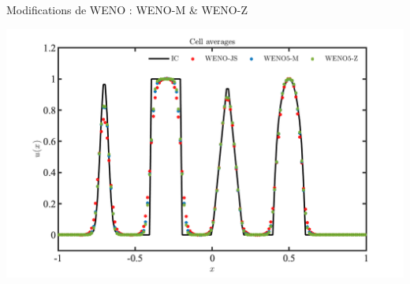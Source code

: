 \documentclass{beamer}
\begin{document}
\begin{frame}{Modifications de WENO : WENO-M \& WENO-Z}
  \begin{center}
    \includegraphics[width=\textwidth]{wenoJSMZ.png}
  \end{center}
\end{frame}
\end{document}
